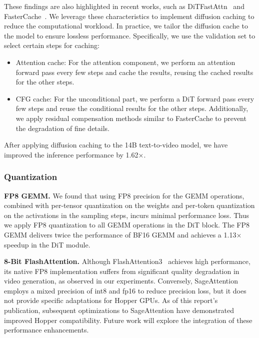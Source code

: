 These findings are also highlighted in recent works, such as DiTFastAttn~\citep{yuan2024ditfastattn} and FasterCache~\citep{lv2024fastercache}.
We leverage these characteristics to implement diffusion caching to reduce the computational workload.
In practice, we tailor the diffusion cache to the \method model to ensure lossless performance. Specifically, we use the validation set to select certain steps for caching:
\begin{itemize}
    \item Attention cache: For the attention component, we perform an attention forward pass every few steps and cache the results, reusing the cached results for the other steps.
    \item CFG cache: For the unconditional part, we perform a DiT forward pass every few steps and reuse the conditional results for the other steps. Additionally, we apply residual compensation methods similar to FasterCache to prevent the degradation of fine details.
\end{itemize}
After applying diffusion caching to the \method 14B text-to-video model, we have improved the inference performance by 1.62×.




\subsubsection{Quantization}

\noindent\textbf{FP8 GEMM.} We found that using FP8 precision for the GEMM operations, combined with per-tensor quantization on the weights and per-token quantization on the activations in the sampling steps, incurs minimal performance loss. Thus we apply FP8 quantization to all GEMM operations in the DiT block.
The FP8 GEMM delivers twice the performance of BF16 GEMM and achieves a 1.13× speedup in the DiT module.

\noindent\textbf{8-Bit FlashAttention.} Although FlashAttention3~\citep{shah2025flashattention} achieves high performance, its native FP8 implementation suffers from significant quality degradation in video generation, as observed in our experiments.
Conversely, SageAttention~\citep{zhang2024sageattention} employs a mixed precision of int8 and fp16 to reduce precision loss, but it does not provide specific adaptations for Hopper GPUs. As of this report's publication, subsequent optimizations to SageAttention have demonstrated improved Hopper compatibility.
Future work will explore the integration of these performance enhancements.

